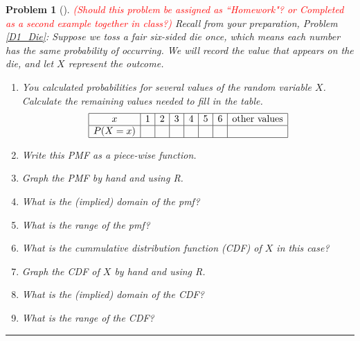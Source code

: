 \documentclass[letterpaper,oneside]{book}%
\theoremstyle{plain}
\theoremstyle{box}
\theoremstyle{problem}
\newtheorem{problemnum}{Problem}[chapter]
\newenvironment{problem}[1][]{\begin{problemnum}[#1]}{\end{problemnum}\nopagebreak\hrule\bigskip}
\begin{document}
\begin{problem} \textcolor{red}{(Should this problem be assigned as ``Homework"? or Completed as a second example together in class?)}
\label{D1_DieContinued}
Recall from your preparation, Problem \ref{D1_Die}: Suppose we toss a fair six-sided die once, which means each number has the same probability of occurring. 
We will record the value that appears on the die, and let $X$ represent the outcome. 
 \begin{enumerate}
  \item You calculated probabilities for several values of the random variable $X$. Calculate the remaining values needed to fill in the table.
    $$\begin{array}{|c|c|c|c|c|c|c|c|}\hline
    x & 1 & 2 & 3 & 4 & 5 & 6 & \text{other values}\\ \hline
    P(X=x) & & & & & & & \\ \hline
    \end{array}$$
  \item Write this PMF as a piece-wise function.
  \item Graph the PMF by hand and using R.
  \item What is the (implied) domain of the pmf?
  \item What is the range of the pmf?
  \item What is the cummulative distribution function (CDF) of $X$ in this case?
  \item Graph the CDF of $X$ by hand and using R.
  \item What is the (implied) domain of the CDF?
  \item What is the range of the CDF?  
 \end{enumerate}
\end{problem}
\end{document}
